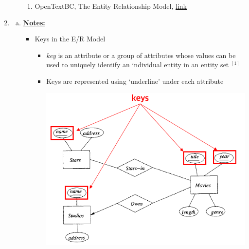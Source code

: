\documentclass[12pt]{article}
\begin{document}
\begin{enumerate}[1.]
\begin{enumerate}[a)]
        \bigskip

        \begin{enumerate}[1)]
            \item OpenTextBC, The Entity Relationship Model, \href{https://opentextbc.ca/dbdesign01/chapter/chapter-8-entity-relationship-model/}{link}
        \end{enumerate}
    \end{enumerate}

    \item

    \begin{enumerate}[a)]
        \item

        \bigskip

        \underline{\textbf{Notes:}}

        \bigskip

        \begin{itemize}
            \item Keys in the E/R Model

            \begin{itemize}
                \item \textit{key} is an attribute or a group of attributes
                whose values can be used to uniquely identify an individual entity in an
                entity set $^{[1]}$

                \item Keys are represented using `underline' under each attribute

                \begin{center}
                \includegraphics[width=0.7\linewidth]{images/worksheet_14_solution_44.png}
                \end{center}
            \end{itemize}


\end{itemize}
\end{enumerate}
\end{enumerate}
\end{document}
